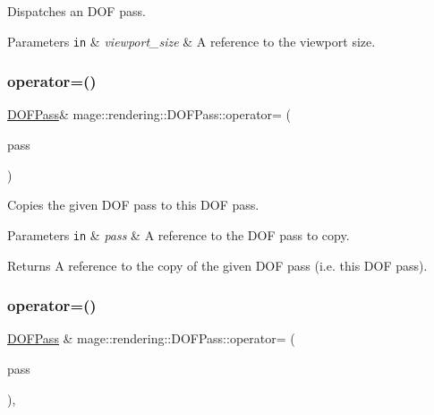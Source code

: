 Dispatches an D\+OF pass.


\begin{DoxyParams}[1]{Parameters}
\mbox{\tt in}  & {\em viewport\+\_\+size} & A reference to the viewport size. \\
\hline
\end{DoxyParams}
\hypertarget{classmage_1_1rendering_1_1_d_o_f_pass_ac70bc446c50db4ab919220a344be8045}{}\label{classmage_1_1rendering_1_1_d_o_f_pass_ac70bc446c50db4ab919220a344be8045} 
\subsubsection{\texorpdfstring{operator=()}{operator=()}\hspace{0.1cm}{\footnotesize\ttfamily [1/2]}}
{\footnotesize\ttfamily \hyperlink{classmage_1_1rendering_1_1_d_o_f_pass}{D\+O\+F\+Pass}\& mage\+::rendering\+::\+D\+O\+F\+Pass\+::operator= (\begin{DoxyParamCaption}\item[{const \hyperlink{classmage_1_1rendering_1_1_d_o_f_pass}{D\+O\+F\+Pass} \&}]{pass }\end{DoxyParamCaption})\hspace{0.3cm}{\ttfamily [delete]}}

Copies the given D\+OF pass to this D\+OF pass.


\begin{DoxyParams}[1]{Parameters}
\mbox{\tt in}  & {\em pass} & A reference to the D\+OF pass to copy. \\
\hline
\end{DoxyParams}
\begin{DoxyReturn}{Returns}
A reference to the copy of the given D\+OF pass (i.\+e. this D\+OF pass). 
\end{DoxyReturn}
\hypertarget{classmage_1_1rendering_1_1_d_o_f_pass_a4155c31b1fe485edf5c7c3b635b737d0}{}\label{classmage_1_1rendering_1_1_d_o_f_pass_a4155c31b1fe485edf5c7c3b635b737d0} 
\subsubsection{\texorpdfstring{operator=()}{operator=()}\hspace{0.1cm}{\footnotesize\ttfamily [2/2]}}
{\footnotesize\ttfamily \hyperlink{classmage_1_1rendering_1_1_d_o_f_pass}{D\+O\+F\+Pass} \& mage\+::rendering\+::\+D\+O\+F\+Pass\+::operator= (\begin{DoxyParamCaption}\item[{\hyperlink{classmage_1_1rendering_1_1_d_o_f_pass}{D\+O\+F\+Pass} \&\&}]{pass }\end{DoxyParamCaption})\hspace{0.3cm}{\ttfamily [default]}, {\ttfamily [noexcept]}}

